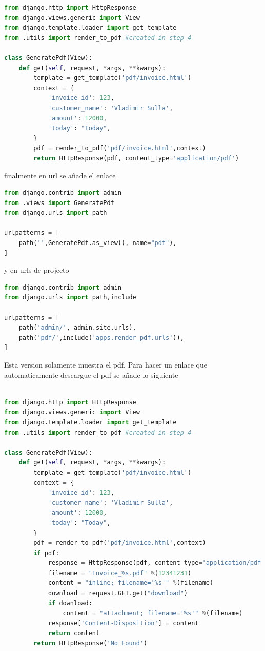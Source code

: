 \documentclass{article}
\begin{document}
\begin{lstlisting}[language=Python]
from django.http import HttpResponse
from django.views.generic import View
from django.template.loader import get_template
from .utils import render_to_pdf #created in step 4

class GeneratePdf(View):
    def get(self, request, *args, **kwargs):
        template = get_template('pdf/invoice.html')
        context = {
            'invoice_id': 123, 
            'customer_name': 'Vladimir Sulla',
            'amount': 12000,
            'today': "Today",
        }
        pdf = render_to_pdf('pdf/invoice.html',context)
        return HttpResponse(pdf, content_type='application/pdf')
\end{lstlisting}

finalmente en url se añade el enlace

\begin{lstlisting}[language=Python]
from django.contrib import admin
from .views import GeneratePdf
from django.urls import path

urlpatterns = [
    path('',GeneratePdf.as_view(), name="pdf"),
]
\end{lstlisting}

y en urls de projecto

\begin{lstlisting}[language=Python]
from django.contrib import admin
from django.urls import path,include

urlpatterns = [
    path('admin/', admin.site.urls),
    path('pdf/',include('apps.render_pdf.urls')),
]
\end{lstlisting}

Esta version solamente muestra el pdf. Para hacer un enlace que automaticamente descargue el pdf se añade lo siguiente

\begin{lstlisting}[language=Python,caption=funcion modificada para un enlace que descargue automaticamente]

from django.http import HttpResponse
from django.views.generic import View
from django.template.loader import get_template
from .utils import render_to_pdf #created in step 4

class GeneratePdf(View):
    def get(self, request, *args, **kwargs):
        template = get_template('pdf/invoice.html')
        context = {
            'invoice_id': 123, 
            'customer_name': 'Vladimir Sulla',
            'amount': 12000,
            'today': "Today",
        }
        pdf = render_to_pdf('pdf/invoice.html',context)
        if pdf:
            response = HttpResponse(pdf, content_type='application/pdf')
            filename = "Invoice_%s.pdf" %(12341231)
            content = "inline; filename='%s'" %(filename)
            download = request.GET.get("download")
            if download:
                content = "attachment; filename='%s'" %(filename) 
            response['Content-Disposition'] = content
            return content
        return HttpResponse('No Found')

\end{lstlisting}
\end{document}
